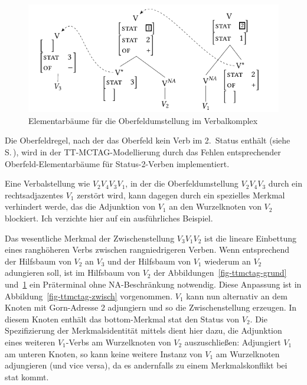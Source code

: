 \begin{figure}[t]
\centering
\includegraphics{graphics/abb711.pdf}
\caption{\label{fig-ttmctag-ober}Elementarbäume für die Oberfeldumstellung im Verbalkomplex}
\end{figure}

Die Oberfeldregel, nach der das Oberfeld kein Verb im 2.~Status enthält (siehe S.\,\pageref{ex-ofr}), wird in der TT-MCTAG-Modellierung durch das Fehlen entsprechender Oberfeld-Elementarbäume für Status-2-Verben implementiert.

Eine Verbalstellung wie $V_2 V_4 V_3 V_1$, in der die Oberfeldumstellung $V_2 V_4 V_3$ durch ein rechtsadjazentes $V_1$ zerstört wird, kann dagegen durch ein spezielles Merkmal verhindert werde, das die Adjunktion von $V_1$ an den Wurzelknoten von $V_2$ blockiert. Ich verzichte hier auf ein ausführliches Beispiel.



Das wesentliche Merkmal der Zwischenstellung $V_3 V_1 V_2$ ist die lineare Einbettung eines ranghöheren Verbs zwischen rangniedrigeren Verben. Wenn entsprechend der Hilfsbaum von $V_2$ an $V_3$ und der Hilfsbaum von $V_1$ wiederum an $V_2$ adungieren soll, ist im Hilfsbaum von $V_2$ der Abbildungen~\ref{fig-ttmctag-grund} und~\ref{fig-ttmctag-ober} ein Präterminal ohne NA-Beschränkung notwendig. Diese Anpassung ist in Abbildung~\ref{fig-ttmctag-zwisch} vorgenommen. $V_1$ kann nun alternativ an dem Knoten mit Gorn-Adresse 2 adjungiern und so die Zwischenstellung erzeugen. In diesem Knoten enthält das {\sc bottom}-Merkmal {\sc stat} den Status von $V_2$. Die Spezifizierung der Merkmalsidentität mittels  dient hier dazu, die Adjunktion eines weiteren $V_1$-Verbs am Wurzelknoten von $V_2$ auszuschlie\ss en: Adjungiert $V_1$ am unteren Knoten, so kann keine weitere Instanz von $V_1$ am Wurzelknoten adjungieren (und vice versa), da es andernfalls zu einem Merkmalskonflikt bei {\sc stat} kommt.          

